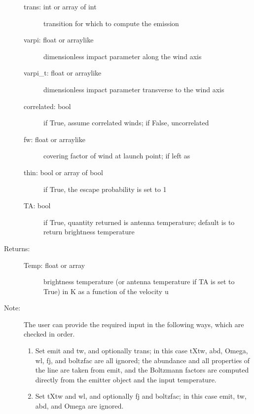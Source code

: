 \documentclass[letterpaper,10pt,english]{sphinxmanual}
\begin{document}
\begin{fulllineitems}
\begin{fulllineitems}
\begin{description}
\begin{description}
\item[{trans: int or array of int}] \leavevmode
transition for which to compute the emission

\item[{varpi: float or arraylike}] \leavevmode
dimensionless impact parameter along the wind axis

\item[{varpi\_t: float or arraylike}] \leavevmode
dimensionless impact parameter transverse to the wind axis

\item[{correlated: bool}] \leavevmode
if True, assume correlated winds; if False, uncorrelated

\item[{fw: float or arraylike}] \leavevmode
covering factor of wind at launch point; if left as

\item[{thin: bool or array of bool}] \leavevmode
if True, the escape probability is set to 1

\item[{TA: bool}] \leavevmode
if True, quantity returned is antenna temperature;
default is to return brightness temperature

\end{description}

\item[{Returns:}] \leavevmode\begin{description}
\item[{Temp: float or array}] \leavevmode
brightness temperature (or antenna temperature if TA is
set to True) in K as a function of the velocity u

\end{description}

\item[{Note:}] \leavevmode
The user can provide the required input in the following
ways, which are checked in order.
\begin{enumerate}
\item {} 
Set emit and tw, and optionally trans; in this case
tXtw, abd, Omega, wl, fj, and boltzfac are all ignored;
the abundance and all properties of the line are taken
from emit, and the Boltzmann factors are computed
directly from the emitter object and the input
temperature.

\item {} 
Set tXtw and wl, and optionally fj and boltzfac; in this
case emit, tw, abd, and Omega are ignored.


\end{enumerate}
\end{description}
\end{fulllineitems}
\end{fulllineitems}
\end{document}

